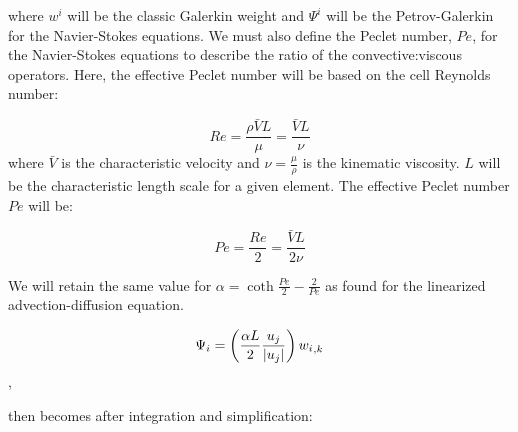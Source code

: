 where $w^{i}$ will be the classic Galerkin weight and $\Psi^{i}$ will be the
Petrov-Galerkin for the Navier-Stokes equations. We must also define the
Peclet number, $Pe$, for the Navier-Stokes equations to describe the ratio
of the convective:viscous operators. Here, the effective Peclet number will be
based on the cell Reynolds number:

\begin{equation}
  Re = \frac{\rho\bar{V}L}{\mu}  =\frac{\bar{V}L}{\nu}
\end{equation}
where $\bar{V}$ is the characteristic velocity and $\nu=\frac{\mu}{\rho}$ is
the kinematic viscosity. $L$ will be the characteristic length scale for a
given element. The effective Peclet number $Pe$ will be:

\begin{equation}
  Pe = \frac{Re}{2} = \frac{\bar{V}L}{2\nu}
\end{equation}

We will retain the same value for
$\alpha={\coth{\frac{Pe}{2}} - \frac{2}{Pe}}$ as found for the
linearized advection-diffusion equation.

\begin{equation}
 \label{PGTest}
  \Psi_i = \pbrac{\frac{\alpha{L}}{2}{\frac{u_j}{\abs{u_j}}}}{\partialderiv{w_{i}}{k}}
\end{equation},

 then becomes after integration and simplification:

